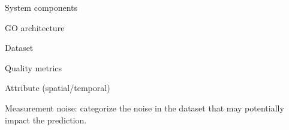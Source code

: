 
\begin{packeditemize}
	\item System components
	\item GO architecture
	\item Dataset
	\item Quality metrics
	\item Attribute (spatial/temporal)
	\item Measurement noise: categorize the noise in the dataset that may potentially impact the prediction. 
\end{packeditemize}
